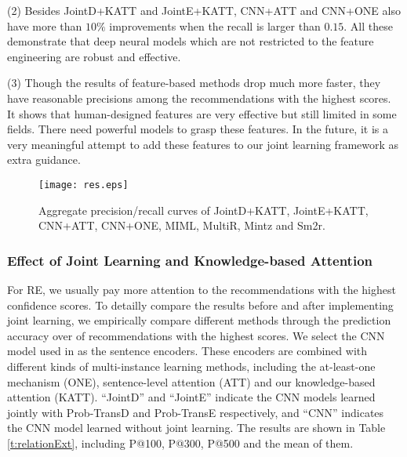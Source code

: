 \documentclass[letterpaper]{article} %
\begin{document}
(2) Besides JointD+KATT and JointE+KATT, CNN+ATT and CNN+ONE also have more than $10\%$ improvements when the recall is larger than $0.15$. All these demonstrate that deep neural models which are not restricted to the feature engineering are robust and effective. 

(3) Though the results of feature-based methods drop much more faster, they have reasonable precisions among the recommendations with the highest scores. It shows that human-designed features are very effective but still limited in some fields. There need powerful models to grasp these features. In the future, it is a very meaningful attempt to add these features to our joint learning framework as extra guidance.

\begin{figure}[t]
\centering
\texttt{[image: res.eps]}
\caption{Aggregate precision/recall curves of JointD+KATT, JointE+KATT, CNN+ATT, CNN+ONE, MIML, MultiR, Mintz and Sm2r.}
\label{fig:jointcnn}
\end{figure} 


\subsubsection{Effect of Joint Learning and Knowledge-based Attention}

For RE, we usually pay more attention to the recommendations with the highest confidence scores. To detailly compare the results before and after implementing joint learning, we empirically compare different methods through the prediction accuracy over of recommendations with the highest scores. We select the CNN model used in \cite{zeng2014relation} as the sentence encoders. These encoders are combined with different kinds of multi-instance learning methods, including the at-least-one mechanism (ONE), sentence-level attention (ATT) and our knowledge-based attention (KATT). ``JointD'' and ``JointE'' indicate the CNN models learned jointly with Prob-TransD and Prob-TransE respectively, and ``CNN'' indicates the CNN model learned without joint learning. The results are shown in Table \ref{t:relationExt}, including P@100, P@300, P@500 and the mean of them.
\end{document}
